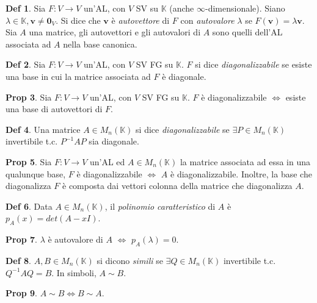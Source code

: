 \documentclass[]{article}
\newcommand{\vv}{\mathbf{v}}
\theoremstyle{definition}
\theoremstyle{definition}
\newtheorem{prop}{Prop}[subsection]
\theoremstyle{definition}
\newtheorem{dfn}[prop]{Def}
\begin{document}
\begin{dfn} Sia $F: V \to V$ un'AL, con $V$ SV su $\mathbb{K}$ (anche $\infty$-dimensionale). Siano $\lambda \in \mathbb{K}, \vv \neq \mathbf{0}_V$. Si dice che $\vv$ è \emph{autovettore} di $F$ con \emph{autovalore} $\lambda$ se $F(\vv ) = \lambda \vv$. Sia $A$ una matrice, gli autovettori e gli autovalori di $A$ sono quelli dell'AL associata ad $A$ nella base canonica.

\end{dfn} \begin{dfn} Sia $F: V \to V$ un'AL, con $V$ SV FG su $\mathbb{K}$. $F$ si dice \emph{diagonalizzabile} se esiste una base in cui la matrice associata ad $F$ è diagonale.

\end{dfn} \begin{prop} Sia $F: V \to V$ un'AL, con $V$ SV FG su $\mathbb{K}$. $F$ è diagonalizzabile $\Leftrightarrow$ esiste una base di autovettori di $F$.

\end{prop} \begin{dfn} Una matrice $A \in M_n (\mathbb{K})$ si dice \emph{diagonalizzabile} se $\exists P \in M_n (\mathbb{K})$ invertibile t.c. $P^{-1}AP$ sia diagonale.

\end{dfn} \begin{prop} Sia $F: V \to V$ un'AL ed $A \in M_n (\mathbb{K})$ la matrice associata ad essa in una qualunque base, $F$ è diagonalizzabile $\Leftrightarrow$ $A$ è diagonalizzabile. Inoltre, la base che diagonalizza $F$ è composta dai vettori colonna della matrice che diagonalizza $A$.

\end{prop} \begin{dfn} Data $A \in M_n (\mathbb{K})$, il \emph{polinomio caratteristico} di $A$ è $p_A (x)=det(A-xI)$.

\end{dfn} \begin{prop} $\lambda$ è autovalore di $A$ $\Leftrightarrow$ $p_A (\lambda)=0$. 

\end{prop} \begin{dfn} $A,B \in M_n (\mathbb{K})$ si dicono \emph{simili} se $\exists Q \in M_n (\mathbb{K})$ invertibile t.c. $Q^{-1}AQ=B$. In simboli, $A \sim B$.

\end{dfn} \begin{prop} $A \sim B \Leftrightarrow B \sim A$.


\end{prop}
\end{document}
